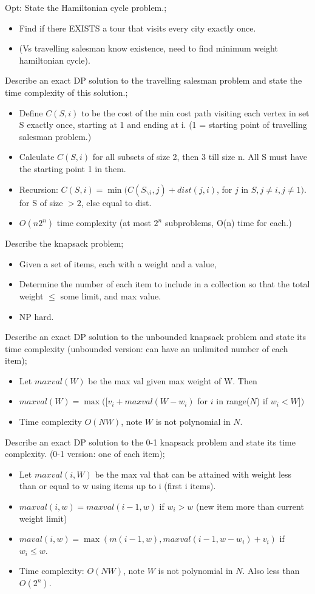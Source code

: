 \documentclass{article}
\begin{document}
Opt: State the Hamiltonian cycle problem.; \begin{itemize} \item Find if there EXISTS a tour that visits every city exactly once.  \item (Vs travelling salesman know existence, need to find minimum weight hamiltonian cycle).  \end{itemize}

Describe an exact DP solution to the travelling salesman problem and state the time complexity of this solution.; \begin{itemize} \item Define $C(S,i)$ to be the cost of the min cost path visiting each vertex in set S exactly once, starting at 1 and ending at i. (1 = starting point of travelling salesman problem.) \item Calculate $C(S,i)$ for all subsets of size 2, then 3 till size n. All S must have the starting point 1 in them.  \item Recursion: $C(S, i)=\min( C(S_{\backslash i}, j) + dist(j, i)$, for $j$ in $S, j \ne i, j \ne 1)$. for S of size $>2$, else equal to dist.  \item $O(n2^n)$ time complexity (at most $2^n$ subproblems, O(n) time for each.) \end{itemize} 

Describe the knapsack problem; \begin{itemize} \item Given a set of items, each with a weight and a value, \item Determine the number of each item to include in a collection so that the total weight $\leq$ some limit, and max value.  \item NP hard.  \end{itemize}

Describe an exact DP solution to the unbounded knapsack problem and state its time complexity (unbounded version: can have an unlimited number of each item); \begin{itemize} \item Let $maxval(W)$ be the max val given max weight of W. Then \item $maxval(W) = \max([v_i + maxval(W-w_i)$ for $i$ in range($N$) if $w_i <W])$ \item Time complexity $O(NW)$, note $W$ is not polynomial in $N$.  \end{itemize}

Describe an exact DP solution to the 0-1 knapsack problem and state its time complexity. (0-1 version: one of each item); \begin{itemize} \item Let $maxval(i, W)$ be the max val that can be attained with weight less than or equal to w using items up to i (first i items).  \item $maxval(i, w)=maxval(i-1, w)$ if $w_i > w$ (new item more than current weight limit) \item $maval(i, w)=\max(m(i-1, w), maxval(i-1, w-w_i)+v_i)$ if $w_i \leq w$.  \item Time complexity: $O(NW)$, note $W$ is not polynomial in $N$. Also less than $O(2^n)$.  \end{itemize}
\end{document}
